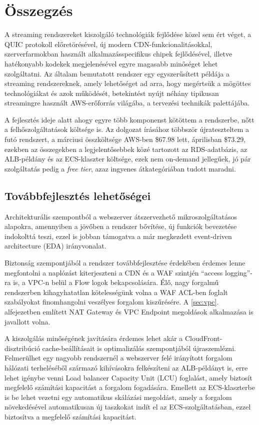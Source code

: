 \chapter{Összegzés}

A streaming rendszereket kiszolgáló technológiák fejlődése közel sem ért véget, a QUIC protokoll előretörésével, új modern CDN-funkcionalitásokkal, szerverfarmokban használt alkalmazásspecifikus chipek fejlődésével, illetve hatékonyabb kodekek megjelenésével egyre magasabb minőséget lehet szolgáltatni. Az általam bemutatott rendszer egy egyszerűsített példája a streaming rendszereknek, amely lehetőséget ad arra, hogy megértsük a mögöttes technológiákat és azok működését, betekintést nyújt néhány tipikusan streamingre használt AWS-erőforrás világába, a tervezési technikák palettájába.

A fejlesztés ideje alatt ahogy egyre több komponenst kötöttem a rendszerbe, nőtt a felhőszolgáltatások költsége is. Az dolgozat írásához többször újrateszteltem a futó rendszert, a márciusi összköltsége AWS-ben \$67.98 lett, áprilisban \$73.29, ezekben az összegekben a legjelentősebbek közé tartozott az RDS-adatbázis, az ALB-példány és az ECS-klaszter költsége, ezek nem on-demand jellegűek, jó pár szolgáltatás pedig a \emph{free tier}, azaz ingyenes átkategóriában tudott maradni.

\section{Továbbfejlesztés lehetőségei}

Architekturális szempontból a webszerver átszervezhető mikroszolgáltatásos alapokra, amennyiben a jövőben a rendszer bővítése, új funkciók bevezetése indokolttá teszi, ezzel is jobban támogatva a már megkezdett event-driven architecture (EDA)\cite{eda} irányvonalat.

Biztonság szempontjából a rendszer továbbfejlesztése érdekében érdemes lenne megfontolni a naplózást kiterjeszteni a CDN és a WAF szintjén ``access logging''-ra is, a VPC-n belül a Flow logok bekapcsolására. Élő, nagy forgalmű rendszerben kihagyhatatlan kötelességünk volna a WAF ACL-ben foglalt szabályokat finomhangolni veszélyes forgalom kiszűrésére. A \ref{sec:vpc}. alfejezetben említett NAT Gateway és VPC Endpoint megoldások alkalmazása is javallott volna.

A kiszolgálás minőségének javítására érdemes lehet akár a CloudFront-disztribúció cache-beállításait is optimalizálás szempontjából újraszemlézni. Felmerülhet egy nagyobb rendszernél a webszerver felé irányított forgalom hálózati terheléséből származó kihívásokra felkészíteni az ALB-példányt is, erre lehet igénybe venni Load balancer Capacity Unit (LCU) foglalást, amely biztosít megfelelő számítási kapacitást a forgalom fogadására. Emellett az ECS-klaszterbe is be lehet vezetni egy automatikus skálázási megoldást, amely a forgalom növekedésével automatikusan új taszkokat indít el az ECS-szolgáltatásban, ezzel biztosítva a megfelelő számítási kapacitást.

